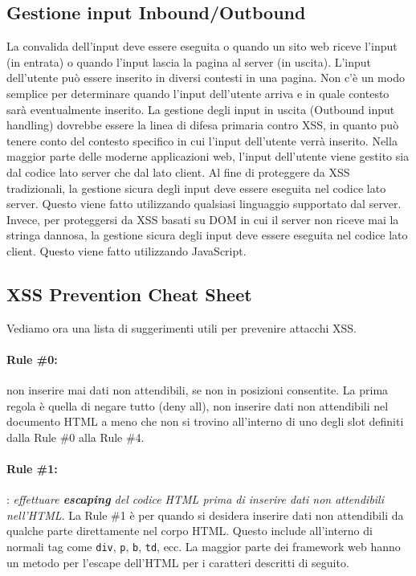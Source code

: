 \subsection{Gestione input Inbound/Outbound}

La convalida dell'input deve essere eseguita o quando un sito web riceve l'input
(in entrata)
o quando l'input lascia la pagina al server (in uscita).
L'input dell'utente può essere inserito in diversi contesti in una pagina.
Non c'è un modo
semplice per determinare quando l'input dell'utente arriva e in quale contesto sarà
eventualmente inserito. La gestione degli input in uscita (Outbound input handling)
dovrebbe
essere la linea di difesa primaria contro XSS, in quanto può tenere conto del
contesto
specifico in cui l'input dell'utente verrà inserito.
Nella maggior parte delle moderne applicazioni web, l'input dell'utente viene
gestito sia dal
codice lato server che dal lato client.
Al fine di proteggere da XSS tradizionali, la gestione sicura degli input deve
essere
eseguita nel codice lato server. Questo viene fatto utilizzando qualsiasi linguaggio
supportato dal server. Invece, per proteggersi da XSS basati su DOM in cui il
server non riceve mai la stringa
dannosa, la gestione sicura degli input deve essere eseguita nel codice lato client.
Questo viene fatto utilizzando JavaScript.

\newpage

\subsection{XSS Prevention Cheat Sheet}

Vediamo ora una lista di suggerimenti utili per prevenire attacchi XSS.

\vspace{-0.5em}

\paragraph{Rule \#0:} non inserire mai dati non attendibili, se non in posizioni
consentite.
La prima regola è quella di negare tutto (deny all), non inserire dati non
attendibili nel documento HTML a meno che non si trovino all'interno di uno degli
slot definiti dalla Rule \#0 alla Rule \#4.

\vspace{-0.5em}

\paragraph{Rule \#1:} : \textit{effettuare \textbf{escaping} del codice HTML
      prima di inserire dati non attendibili nell'HTML}.
La Rule \#1 è per quando si desidera inserire dati non attendibili da qualche
parte
direttamente nel corpo HTML. Questo include all'interno di normali tag come
\verb|div|, \verb|p|, \verb|b|, \verb|td|,
ecc. La maggior parte dei framework web hanno un metodo per l'escape dell'HTML
per i caratteri descritti di seguito.

